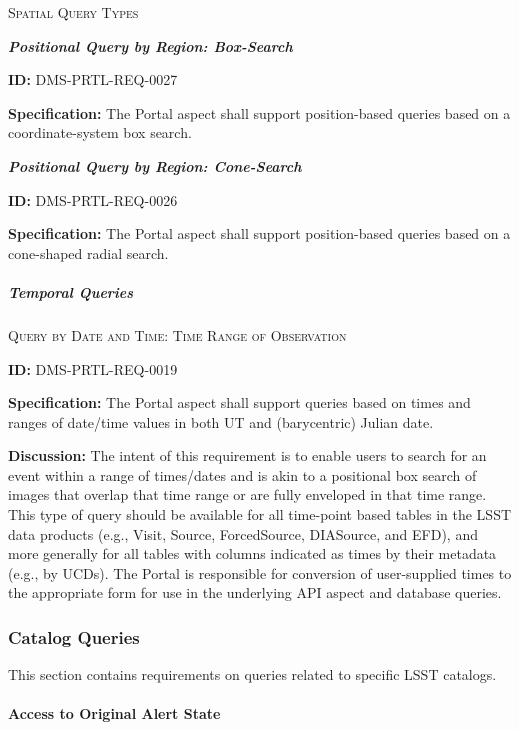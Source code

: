 \documentclass[SE,toc,lsstdraft]{lsstdoc}
\begin{document}
\textsc{Spatial Query Types}

\textbf{\textit{Positional Query by Region: Box-Search}}

\label{DMS-PRTL-REQ-0027}
\textbf{ID:} DMS-PRTL-REQ-0027

\textbf{Specification:}
The Portal aspect shall support position-based queries based on a coordinate-system box search.

\textbf{\textit{Positional Query by Region: Cone-Search}}

\label{DMS-PRTL-REQ-0026}
\textbf{ID:} DMS-PRTL-REQ-0026

\textbf{Specification:}
The Portal aspect shall support position-based queries based on a cone-shaped radial search.

\subparagraph{Temporal Queries}\hfill  %

\textsc{Query by Date and Time: Time Range of Observation}

\label{DMS-PRTL-REQ-0019}
\textbf{ID:} DMS-PRTL-REQ-0019

\textbf{Specification:}
The Portal aspect shall support queries based on times and ranges of date/time values in both UT and (barycentric) Julian date.

\textbf{Discussion:}
The intent of this requirement is to enable users to search for an event within a range of times/dates and is akin to a positional box search of images that overlap that time range or are fully enveloped in that time range.
This type of query should be available for all time-point based tables in the LSST data products (e.g., Visit, Source, ForcedSource, DIASource, and EFD), and more generally for all tables with columns indicated as times by their metadata (e.g., by UCDs).
The Portal is responsible for conversion of user-supplied times to the appropriate form for use in the underlying API aspect and database queries.

\subsubsection{Catalog Queries}

This section contains requirements on queries related to specific LSST catalogs.

\paragraph{Access to Original Alert State}\hfill  %
\end{document}
